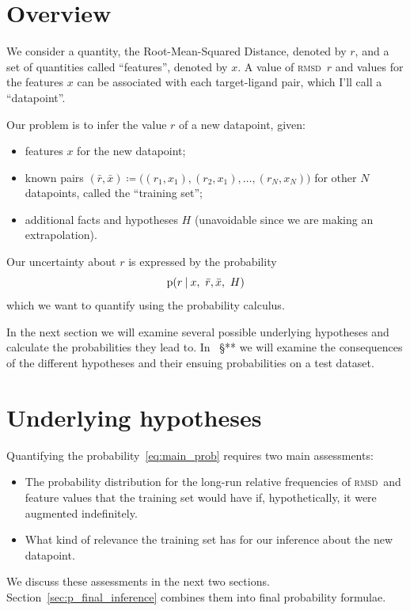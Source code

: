 \documentclass[\ifafour a4paper,12pt,\else a5paper,10pt,\fi%
onecolumn,oneside,article,%
british%
]{memoir}
\theoremstyle{remark}
\theoremstyle{innote}
\newcommand*{\defd}{\coloneqq}
\newcommand*{\p}{\mathrm{p}}%
\renewcommand*{\|}[1][]{\nonscript\:#1\vert\nonscript\:\mathopen{}}
\renewcommand*{\=}{\TextOrMath\texteq\eq}
\newcommand*{\sect}{\S}%
\newcommand*{\wrench}{{\fontencoding{U}\fontfamily{fontawesomethree}\selectfont\symbol{114}}}
\newcommand{\mynote}[1]{ {\color{notecolour}#1}}
\newcommand*{\rmsd}{\textsc{rmsd}}
\newcommand*{\ro}{r}
\newcommand*{\xo}{x}
\newcommand*{\rd}{\bar{r}}
\newcommand*{\xd}{\bar{x}}
\begin{document}
\section{Overview}
\label{sec:overview}

We consider a quantity, the Root-Mean-Squared Distance, denoted by $r$, and
a set of quantities called \enquote{features}, denoted by $x$. A
value of \rmsd\ $r$
and values for the  features $x$ can be associated with each target-ligand
pair, which I'll call a \enquote{datapoint}.

Our problem is to infer the value $\ro$ of a new datapoint, given:
\begin{itemize}
\item features $\xo$ for the new datapoint;
\item known pairs
  $(\rd,\xd) \defd \bigl((r_{1}, x_{1}), (r_{2}, x_{1}), \dotsc, (r_{N},
  x_{N})\bigr)$ for other $N$ datapoints, called the \enquote{training
    set};
\item additional facts and hypotheses $H$ (unavoidable since we are making an
extrapolation).
\end{itemize}

Our uncertainty about $\ro$ is expressed by the probability
\begin{equation}
  \label{eq:main_prob}
  \p(\ro \| \xo,\ \rd,\xd,\ H)
\end{equation}
which we want to quantify using the probability calculus.

In the next section we will examine several possible underlying hypotheses
and calculate the probabilities they lead to. In \mynote{\wrench\ \sect***}
we will examine the consequences of the different hypotheses and their
ensuing probabilities on a test dataset.


\section{Underlying hypotheses}
\label{sec:hypotheses}

Quantifying the probability~\eqref{eq:main_prob} requires two main
assessments:
\begin{itemize}
\item The probability distribution for the long-run relative frequencies of
  \rmsd\ and feature values that the training set would have if,
  hypothetically, it were augmented indefinitely.
\item What kind of relevance the training set has for our inference about
  the new datapoint.
\end{itemize}
We discuss these assessments in the next two sections.
Section~\ref{sec:p_final_inference} combines them into final probability
formulae.
\end{document}
